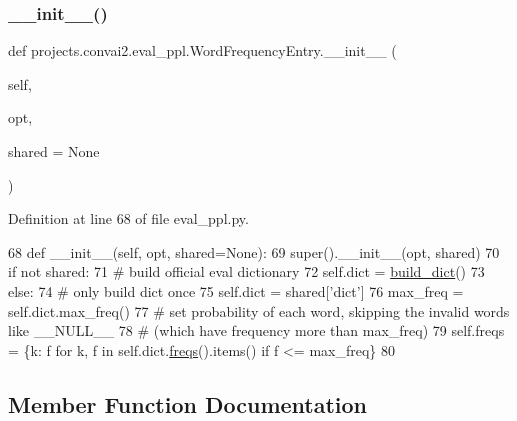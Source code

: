 \subsubsection{\texorpdfstring{\+\_\+\+\_\+init\+\_\+\+\_\+()}{\_\_init\_\_()}}
{\footnotesize\ttfamily def projects.\+convai2.\+eval\+\_\+ppl.\+Word\+Frequency\+Entry.\+\_\+\+\_\+init\+\_\+\+\_\+ (\begin{DoxyParamCaption}\item[{}]{self,  }\item[{}]{opt,  }\item[{}]{shared = {\ttfamily None} }\end{DoxyParamCaption})}



Definition at line 68 of file eval\+\_\+ppl.\+py.


\begin{DoxyCode}
68     \textcolor{keyword}{def }\_\_init\_\_(self, opt, shared=None):
69         super().\_\_init\_\_(opt, shared)
70         \textcolor{keywordflow}{if} \textcolor{keywordflow}{not} shared:
71             \textcolor{comment}{# build official eval dictionary}
72             self.dict = \hyperlink{namespacebuild__dict}{build\_dict}()
73         \textcolor{keywordflow}{else}:
74             \textcolor{comment}{# only build dict once}
75             self.dict = shared[\textcolor{stringliteral}{'dict'}]
76         max\_freq = self.dict.max\_freq()
77         \textcolor{comment}{# set probability of each word, skipping the invalid words like \_\_NULL\_\_}
78         \textcolor{comment}{# (which have frequency more than max\_freq)}
79         self.freqs = \{k: f \textcolor{keywordflow}{for} k, f \textcolor{keywordflow}{in} self.dict.\hyperlink{namespaceparlai_1_1agents_1_1tfidf__retriever_1_1build__tfidf_abb3607652abdd76d57a6ae90e19e3828}{freqs}().items() \textcolor{keywordflow}{if} f <= max\_freq\}
80 
\end{DoxyCode}


\subsection{Member Function Documentation}
\mbox{\label{classprojects_1_1convai2_1_1eval__ppl_1_1WordFrequencyEntry_abc7d4ea01f82e42e8a18794e620de005}} 
